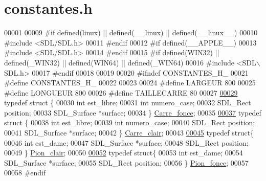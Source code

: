 \hypertarget{constantes_8h_source}{
\section{constantes.h}
}

\begin{DoxyCode}
00001 
00009 \textcolor{preprocessor}{#if defined(linux) || defined(\_\_linux) || defined(\_\_linux\_\_)}
00010 \textcolor{preprocessor}{}\textcolor{preprocessor}{#include <SDL/SDL.h>}
00011 \textcolor{preprocessor}{#endif}
00012 \textcolor{preprocessor}{}\textcolor{preprocessor}{#if defined(\_\_APPLE\_\_)}
00013 \textcolor{preprocessor}{}\textcolor{preprocessor}{#include <SDL/SDL.h>}
00014 \textcolor{preprocessor}{#endif}
00015 \textcolor{preprocessor}{}\textcolor{preprocessor}{#if defined(WIN32) || defined(\_WIN32) || defined(WIN64) || defined(\_WIN64)}
00016 \textcolor{preprocessor}{}\textcolor{preprocessor}{#include <SDL\(\backslash\)SDL.h>}
00017 \textcolor{preprocessor}{#endif}
00018 \textcolor{preprocessor}{}
00019 
00020 \textcolor{preprocessor}{#ifndef CONSTANTES\_H\_}
00021 \textcolor{preprocessor}{}\textcolor{preprocessor}{#define CONSTANTES\_H\_}
00022 \textcolor{preprocessor}{}
00023 
00024 \textcolor{preprocessor}{#define LARGEUR 800}
00025 \textcolor{preprocessor}{}\textcolor{preprocessor}{#define LONGUEUR 800}
00026 \textcolor{preprocessor}{}\textcolor{preprocessor}{#define TAILLECARRE 80}
00027 \textcolor{preprocessor}{}
\hypertarget{constantes_8h_source_l00029}{}\hyperlink{struct_carre__fonce}{00029} \textcolor{keyword}{typedef} \textcolor{keyword}{struct }\{
00030         \textcolor{keywordtype}{int} est\_libre;
00031         \textcolor{keywordtype}{int} numero\_case;
00032         SDL\_Rect position;
00033         SDL\_Surface *surface;
00034 \} \hyperlink{struct_carre__fonce}{Carre_fonce};
00035 
\hypertarget{constantes_8h_source_l00037}{}\hyperlink{struct_carre__clair}{00037} \textcolor{keyword}{typedef} \textcolor{keyword}{struct }\{
00038         \textcolor{keywordtype}{int} est\_libre;
00039         \textcolor{keywordtype}{int} numero\_case;
00040         SDL\_Rect position;
00041         SDL\_Surface *surface;
00042 \} \hyperlink{struct_carre__clair}{Carre_clair};
00043 
\hypertarget{constantes_8h_source_l00045}{}\hyperlink{struct_pion__clair}{00045} \textcolor{keyword}{typedef} \textcolor{keyword}{struct}\{
00046         \textcolor{keywordtype}{int} est\_dame;
00047         SDL\_Surface *surface;
00048         SDL\_Rect position;
00049 \} \hyperlink{struct_pion__clair}{Pion_clair};
00050 
\hypertarget{constantes_8h_source_l00052}{}\hyperlink{struct_pion__fonce}{00052} \textcolor{keyword}{typedef} \textcolor{keyword}{struct}\{
00053         \textcolor{keywordtype}{int} est\_dame;
00054         SDL\_Surface *surface;
00055         SDL\_Rect position;
00056 \} \hyperlink{struct_pion__fonce}{Pion_fonce};
00057 
00058 \textcolor{preprocessor}{#endif}
\end{DoxyCode}
